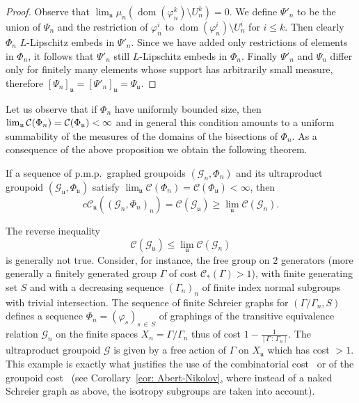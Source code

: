 \documentclass[AHL,Unicode,longabstracts,published]{cedram}
\newcommand{\cost}{\mathcal{C}}
\newcommand{\ccost}{c\mathcal{C}}
\newcommand{\cg}{\mathcal{G}}
\newcommand{\vraicost}{\mathscr{C}}
\DeclareMathOperator{\dom}{dom}
\newcommand{\ul}{\mathfrak{u}}
\newcommand{\ph}{\varphi}
\newcommand{\pmp}{p.m.p.\ }
\begin{document}
\begin{proof}
Observe that $\lim_\ul\mu_n(\dom(\ph^k_n)\setminus U^k_n)=0$. We define $\Psi'_n$ to be the union of $\Psi_n$ and the restriction of $\ph^i_n$ to $\dom(\ph^i_n)\setminus U_n^{i}$ for $i\leq k$. Then clearly $\Phi_n$ $L$-Lipschitz embeds in $\Psi'_n$. Since we have added only restrictions of elements in $\Phi_n$, it follows that $\Psi'_n$ still $L$-Lipschitz embeds in $\Phi_n$. Finally $\Psi'_n$ and $\Psi_n$ differ only for finitely many elements whose support has arbitrarily small measure, therefore $[\Psi_n]_\ul=[\Psi'_n]_\ul=\Psi_\ul$.
\end{proof}

Let us observe that if $\Phi_n$ have uniformly bounded size, then $\lim_\ul \cost(\Phi_n) = \cost(\Phi_\ul)\linebreak<\infty$ and in general this condition amounts to a uniform summability of the measures of the domains of the bisections of $\Phi_n$. As a consequence of the above proposition we obtain the following theorem.

\begin{theo}\label{thm:costccost}
If a sequence of \pmp graphed groupoids $(\cg_n,\Phi_n)$ and its ultraproduct groupoid $(\cg_\ul,\Phi_\ul)$ satisfy $\lim_\ul \cost(\Phi_n) = \cost(\Phi_\ul) <\infty$, then
\[
\ccost_\ul((\cg_n,\Phi_n)_n)=\cost(\cg_\ul)\geq\lim_{\ul}\cost(\cg_{n}).
\]
\end{theo}

\begin{rema}\label{rem: counterex revers ineq non-group}
The reverse inequality
\begin{equation}
\cost(\cg_\ul)\leq \lim_{\ul}\cost(\cg_{n})
\end{equation}
is generally not true. Consider, for instance, the free group on $2$ generators (more generally a finitely generated group $\Gamma$ of cost $\vraicost_{*}(\Gamma)>1$), with finite generating set $S$ and with a decreasing sequence $(\Gamma_n)_n$ of finite index normal subgroups with trivial intersection. The sequence of finite Schreier graphs for $(\Gamma/\Gamma_n, S)$ defines a sequence $\Phi_n=(\ph_s)_{s\,\in\,S}$ of graphings of the transitive equivalence relation $\cg_n$ on the finite spaces $X_n=\Gamma/\Gamma_n$ thus of cost $1-\tfrac{1}{[\Gamma\,:\,\Gamma_n]}$. The ultraproduct groupoid $\cg$ is given by a free action of $\Gamma$ on $X_\ul$ which has cost $>1$. This example is exactly what justifies the use of the combinatorial cost~\cite{Elek-combinatorial-cost-2007} or of the groupoid cost~\cite{Abert-Nikolov-12} (see Corollary~\ref{cor: Abert-Nikolov}, where instead of a naked Schreier graph as above, the isotropy subgroups are taken into account).
\end{rema}
\end{document}
